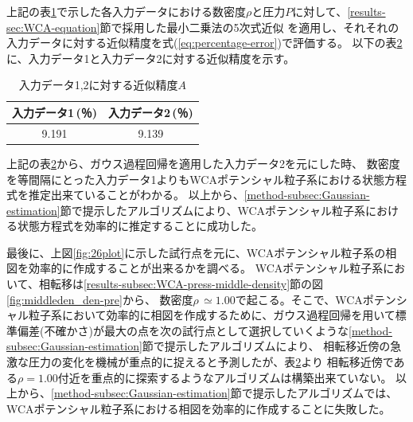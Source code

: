 \documentclass[titlepage]{jsreport}
\begin{document}
{{{\begin{table}[htbp]
\begin{center}
\begin{tabular}{c||c c c c c c c c c c c c c c c c c c c c c c c c c c}
            \end{tabular}
    \end{center}
    \label{table:compare-Gauss}
\end{table}

\newpage
上記の表\ref{table:compare-Gauss}で示した各入力データにおける数密度$\rho$と圧力$P$に対して、\ref{results-sec:WCA-equation}節で採用した最小二乗法の5次式近似
を適用し、それそれの入力データに対する近似精度を式(\ref{eq:percentage-error})で評価する。
以下の表\ref{table:compare-approximation-accuracy}に、入力データ1と入力データ2に対する近似精度を示す。

\begin{table}[htbp]
    \begin{center}
        \caption{入力データ1,2に対する近似精度$A$}
            \begin{tabular}{c c}
                    入力データ1\,(％) & 入力データ2\,(％) \\ \hline\hline
                    9.191 & 9.139
            \end{tabular}
    \end{center}
    \label{table:compare-approximation-accuracy}
\end{table}

上記の表\ref{table:compare-approximation-accuracy}から、ガウス過程回帰を適用した入力データ2を元にした時、
数密度を等間隔にとった入力データ1よりもWCAポテンシャル粒子系における状態方程式を推定出来ていることがわかる。
以上から、\ref{method-subsec:Gaussian-estimation}節で提示したアルゴリズムにより、WCAポテンシャル粒子系における状態方程式を効率的に推定することに成功した。

最後に、上図\ref{fig:26plot}に示した試行点を元に、WCAポテンシャル粒子系の相図を効率的に作成することが出来るかを調べる。
WCAポテンシャル粒子系において、相転移は\ref{results-subsec:WCA-press-middle-density}節の図\ref{fig:middleden_den-pre}から、
数密度$\rho\,{\simeq}1.00$で起こる。そこで、WCAポテンシャル粒子系において効率的に相図を作成するために、ガウス過程回帰を用いて標準偏差(不確かさ)が最大の点を次の試行点として選択していくような\ref{method-subsec:Gaussian-estimation}節で提示したアルゴリズムにより、
相転移近傍の急激な圧力の変化を機械が重点的に捉えると予測したが、表\ref{table:compare-approximation-accuracy}より
相転移近傍である$\rho=1.00$付近を重点的に探索するようなアルゴリズムは構築出来ていない。
以上から、\ref{method-subsec:Gaussian-estimation}節で提示したアルゴリズムでは、WCAポテンシャル粒子系における相図を効率的に作成することに失敗した。

}}}
\end{document}
